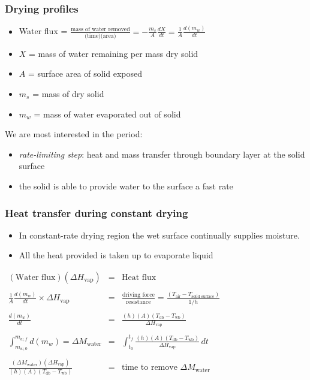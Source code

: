 \begin{frame}\frametitle{Drying profiles}
	\begin{itemize}
		\item	Water flux = $\displaystyle \frac{\text{mass of water removed}}{\text{(time)(area)}} = - \displaystyle \frac{m_s}{A} \frac{dX}{dt} = \frac{1}{A} \frac{d(m_w)}{dt}$
		\item	$X$ = mass of water remaining per mass dry solid
		\item	$A$ = surface area of solid exposed
		\item	$m_s$ = mass of dry solid
		\item	$m_w$ = mass of water evaporated out of solid
	\end{itemize}
	\vspace{12pt}
	We are most interested in the {\color{purple}{constant drying-rate}} period:
	\begin{itemize}
		\item	\emph{rate-limiting step}: heat and mass transfer through boundary layer at the solid surface
		\item	the solid is able to provide water to the surface a fast rate
	\end{itemize}
\end{frame}

\begin{frame}\frametitle{Heat transfer during constant drying}
	\begin{itemize}
		\item	In constant-rate drying region the wet surface continually supplies moisture.
		\item	All the heat provided is taken up to evaporate liquid
	\end{itemize}
	\vspace{12pt}
	$\begin{array}{rcl}
		(\text{Water flux})(\Delta H_\text{vap})  							&=& \text{Heat flux}\\ 
		\\
		\displaystyle\frac{1}{A} \frac{d(m_w)}{dt} \times \Delta H_\text{vap} 	&=& \displaystyle\frac{\text{driving force}}{\text{resistance}} = \displaystyle\frac{(T_\text{air} - T_\text{solid surface}) }{1/h} \\
		\\
		\displaystyle \frac{d(m_w)}{dt}   										&=& \displaystyle\frac{(h)(A)(T_\text{db} - T_\text{wb})}{\Delta H_\text{vap}}  \\
		\\
		\displaystyle \int_{m_{w,0}}^{m_{w,f}}{d(m_w)} = \Delta M_\text{water}	&=& \displaystyle \int_{t_0}^{t_f}{\frac{(h)(A)(T_\text{db} - T_\text{wb})}{\Delta H_\text{vap}}\, dt} \\
		\\
		\displaystyle  \frac{(\Delta M_\text{water}) (\Delta H_\text{vap})}{(h)(A)(T_\text{db} - T_\text{wb})} &=& \text{time to remove $\Delta M_\text{water}$}
	\end{array}$
\end{frame}


